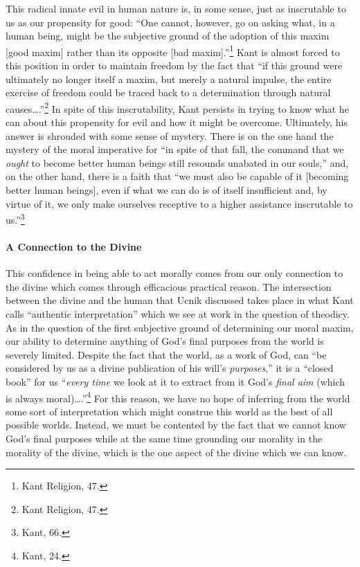 \documentclass[12pt]{article}
\begin{document}
	This radical innate evil in human nature is, in some sense, just as inscrutable to us as our propensity for good: ``One cannot, however, go on asking what, in a human being, might be the subjective ground of the adoption of this maxim [good maxim] rather than its opposite [bad maxim].''\footnote{Kant Religion, 47.} Kant is almost forced to this position in order to maintain freedom by the fact that ``if this ground were ultimately no longer itself a maxim, but merely a natural impulse, the entire exercise of freedom could be traced back to a determination through natural causes\ldots.''\footnote{Kant Religion, 47.} In spite of this inscrutability, Kant persists in trying to know what he can about this propensity for evil and how it might be overcome. Ultimately, his answer is shrouded with some sense of mystery. There is on the one hand the mystery of the moral imperative for ``in spite of that fall, the command that we \emph{ought} to become better human beings still resounds unabated in our souls,'' and, on the other hand, there is a faith that ``we must also be capable of it [becoming better human beings], even if what we can do is of itself insufficient and, by virtue of it, we only make ourselves receptive to a higher assistance inscrutable to us.''\footnote{Kant, 66.} 
	
	\paragraph*{A Connection to the Divine} This confidence in being able to act morally comes from our only connection to the divine which comes through efficacious practical reason. The intersection between the divine and the human that Ucnik discussed takes place in what Kant calls ``authentic interpretation'' which we see at work in the question of theodicy. As in the question of the first subjective ground of determining our moral maxim, our ability to determine anything of God's final purposes from the world is severely limited. Despite the fact that the world, as a work of God, can ``be considered by us as a divine publication of his will's \emph{purposes},'' it is a ``closed book'' for us ``\emph{every time} we look at it to extract from it God's \emph{final aim} (which is always moral)\ldots.''\footnote{Kant, 24.} For this reason, we have no hope of inferring from the world some sort of interpretation which might construe this world as the best of all possible worlds. Instead, we must be contented by the fact that we cannot know God's final purposes while at the same time grounding our morality in the morality of the divine, which is the one aspect of the divine which we can know. 
	
\end{document}
